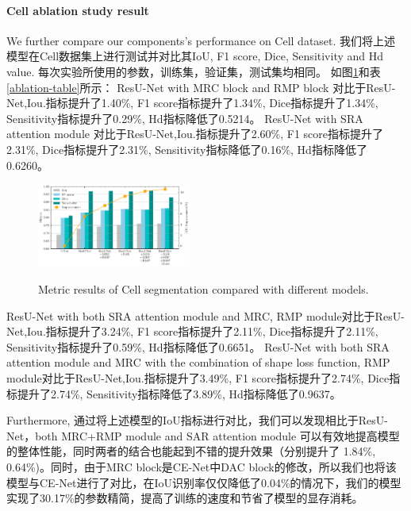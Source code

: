 \documentclass{ieeeaccess}
\begin{document}
  \paragraph{Cell ablation study result}
  We further compare our components's performance on Cell dataset.
  我们将上述模型在Cell数据集上进行测试并对比其IoU, F1 score, Dice, Sensitivity and Hd value. 每次实验所使用的参数，训练集，验证集，测试集均相同。
  如图\ref{fig:cell_comparison}和表\ref{ablation-table}所示：
  ResU-Net with MRC block and RMP block 对比于ResU-Net,Iou.指标提升了1.40\%, F1 score指标提升了1.34\%, Dice指标提升了1.34\%, Sensitivity指标提升了0.29\%, Hd指标降低了0.5214。
  ResU-Net with SRA attention module 对比于ResU-Net,Iou.指标提升了2.60\%, F1 score指标提升了2.31\%, Dice指标提升了2.31\%, Sensitivity指标降低了0.16\%, Hd指标降低了0.6260。
  \begin{figure}[htbp]
    \begin{center}
    \includegraphics[width=0.45\textwidth]{figure/cell_comparison.pdf}
    \vspace{-2mm}
    \caption{Metric results of Cell segmentation compared with different models.} 
    \vspace{-2mm}
    \label{fig:cell_comparison}
    \end{center}
    \vspace{-0.35cm}
  \end{figure}
  ResU-Net with both SRA attention module and MRC, RMP module对比于ResU-Net,Iou.指标提升了3.24\%, F1 score指标提升了2.11\%, Dice指标提升了2.11\%, Sensitivity指标提升了0.59\%, Hd指标降低了0.6651。
  ResU-Net with both SRA attention module and MRC with the combination of shape loss function, 
  RMP module对比于ResU-Net,Iou.指标提升了3.49\%, F1 score指标提升了2.74\%, Dice指标提升了2.74\%, Sensitivity指标降低了3.89\%, Hd指标降低了0.9637。
  
  Furthermore, 通过将上述模型的IoU指标进行对比，我们可以发现相比于ResU-Net，both MRC+RMP module and SAR attention module 可以有效地提高模型的整体性能，同时两者的结合也能起到不错的提升效果（分别提升了
  1.84\%, 0.64\%)。同时，由于MRC block是CE-Net中DAC block的修改，所以我们也将该模型与CE-Net进行了对比，在IoU识别率仅仅降低了0.04\%的情况下，我们的模型实现了30.17\%的参数精简，提高了训练的速度和节省了模型的显存消耗。
\end{document}
